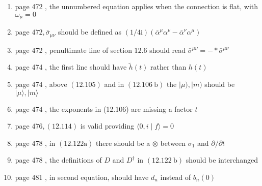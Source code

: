 \documentclass{article}
\begin{document}
\begin{enumerate}
\item page 472 , the unnumbered equation applies when the connection is flat, with $\omega_{\mu}=0$

\item page $472, \bar{\sigma}_{\mu \nu}$ should be defined as $(1 / 4 \mathrm{i})\left(\bar{\alpha}^{\mu} \alpha^{\nu}-\bar{\alpha}^{\nu} \alpha^{\mu}\right)$

\item page 472 , penultimate line of section $12.6$ should read $\bar{\sigma}^{\mu \nu}=-* \bar{\sigma}^{\mu \nu}$

\item page 474 , the first line should have $\tilde{h}(t)$ rather than $h(t)$

\item page 474 , above $(12.105)$ and in $(12.106 \mathrm{~b})$ the $\mid \mu), \mid m)$ should be $|\mu\rangle,|m\rangle$

\item page 474 , the exponents in (12.106) are missing a factor $t$

\item page $476,(12.114)$ is valid providing $\langle 0, i \mid f\rangle=0$

\item page 478 , in $(12.122 \mathrm{a})$ there should be a $\otimes$ between $\sigma_{1}$ and $\partial / \partial t$

\item page 478 , the definitions of $D$ and $D^{\dagger}$ in $(12.122 \mathrm{~b})$ should be interchanged

\item page 481 , in second equation, should have $d_{n}$ instead of $b_{n}(0)$ 
\end{enumerate}
\end{document}
